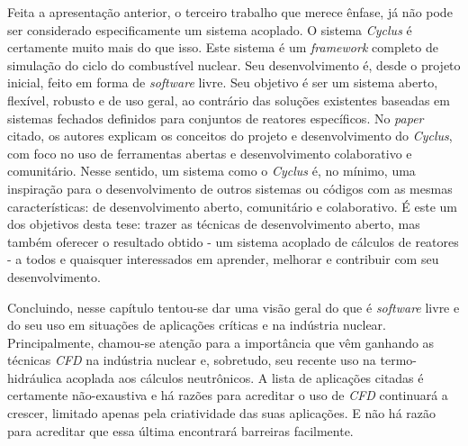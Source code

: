 Feita a apresentação anterior, o terceiro trabalho que merece ênfase, já não pode ser considerado
especificamente um sistema acoplado. O sistema \textit{Cyclus} \cite{Huff2016} é certamente muito mais
do que isso. Este sistema é um \textit{framework} completo de simulação do ciclo do combustível nuclear.
Seu desenvolvimento é, desde o projeto inicial, feito em forma de \textit{software} livre. Seu objetivo é ser um sistema aberto,
flexível, robusto e de uso geral, ao contrário das soluções existentes baseadas em sistemas fechados
definidos para conjuntos de reatores específicos.
No \textit{paper} citado, os autores explicam os conceitos do projeto e desenvolvimento do \textit{Cyclus}, com
foco no uso de ferramentas abertas e desenvolvimento colaborativo e comunitário. Nesse sentido, um sistema
como o \textit{Cyclus} é, no mínimo, uma inspiração para o desenvolvimento de outros sistemas ou códigos
com as mesmas características: de desenvolvimento aberto, comunitário e colaborativo. É este um dos objetivos
desta tese: trazer as técnicas de desenvolvimento aberto, mas também oferecer o resultado obtido -
um sistema acoplado de cálculos de reatores - a todos e quaisquer interessados em aprender, melhorar
e contribuir com seu desenvolvimento.

Concluindo, nesse capítulo tentou-se dar uma visão geral do que é \textit{software} livre e do
seu uso em situações de aplicações
críticas e na indústria nuclear. Principalmente, chamou-se atenção para a importância que vêm ganhando as
técnicas \textit{CFD} na indústria nuclear e, sobretudo, seu recente uso na termo-hidráulica acoplada aos cálculos
neutrônicos. A lista de aplicações citadas é certamente não-exaustiva e há razões para
acreditar o uso de \textit{CFD} continuará a crescer, limitado apenas pela criatividade
das suas aplicações. E não há razão para acreditar que essa última encontrará barreiras
facilmente.




%

%    
%    


